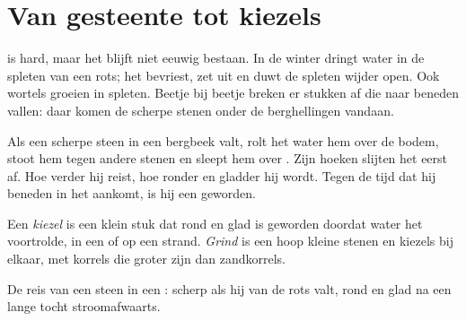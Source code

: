 \section{Van gesteente tot kiezels}

 is hard, maar het blijft niet eeuwig bestaan. In de winter dringt
water in de spleten van een rots; het bevriest, zet uit en duwt de spleten
wijder open. Ook wortels groeien in spleten. Beetje bij beetje breken er
stukken af die naar beneden vallen: daar komen de scherpe stenen onder de
berghellingen vandaan.

Als een scherpe steen in een bergbeek valt, rolt het water hem over de
bodem, stoot hem tegen andere stenen en sleept hem over . Zijn hoeken
slijten het eerst af. Hoe verder hij reist, hoe ronder en gladder hij
wordt. Tegen de tijd dat hij beneden in het  aankomt, is hij een 
geworden.

\begin{definition}\label{def:g3:stones-pebbles-sand:pebble}
Een \emph{kiezel} is een klein stuk  dat rond en
glad is geworden doordat water het voortrolde, in een  of op een
strand. \emph{Grind} is een hoop kleine stenen en kiezels bij
elkaar, met korrels die groter zijn dan zandkorrels.
\end{definition}

\begin{omfigure}

{\small De reis van een steen in een : scherp als hij van de rots
valt, rond en glad na een lange tocht stroomafwaarts.}
\label{fig:g3:stones-pebbles-sand:journey}
\end{omfigure}

